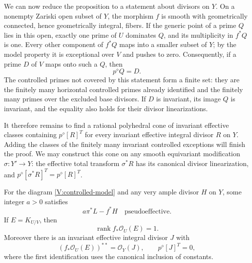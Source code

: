 We can now reduce the proposition to a statement about divisors on
$Y$.  On a nonempty Zariski open subset of $Y$, the morphism $f$ is
smooth with geometrically connected, hence geometrically integral,
fibers.  If the generic point of a prime $Q$ lies in this open, exactly
one prime of $U$ dominates $Q$, and its multiplicity in $f^*Q$ is one.
Every other component of $f^*Q$ maps into a smaller subset of $Y$;
by the model property it is exceptional over $V$ and pushes to zero.
Consequently, if a prime $D$ of $V$ maps onto such a $Q$, then
\[
 p^\diamond Q=D.
\]
The controlled primes not covered by this statement form a finite
set: they are the finitely many horizontal controlled primes already
identified and the finitely many primes over the excluded base divisors.
If $D$ is invariant, its image $Q$ is invariant, and the equality also
holds for their divisor linearizations.

It therefore remains to find a rational polyhedral cone of invariant
effective classes containing $p^\diamond[R]^T$ for every invariant
effective integral divisor $R$ on $Y$.  Adding the classes of the
finitely many invariant controlled exceptions will finish the proof.
We may construct this cone on any smooth equivariant modification
$\sigma:Y'\to Y$: the effective total transform $\sigma^*R$ has its
canonical divisor linearization, and
$p^\diamond[\sigma^*R]^T=p^\diamond[R]^T$.

\begin{lemma}\label{V:controlled-rank-metric-data}
For the diagram \eqref{V:controlled-model} and any very ample divisor
$H$ on $Y$, some integer $a>0$ satisfies
\begin{equation}\label{V:controlled-domination}
 a\pi^*L-f^*H\quad\text{pseudoeffective}.
\end{equation}
If $E=K_{U/V}$, then
\begin{equation}\label{V:controlled-rank}
 \operatorname{rank}f_*\mathcal O_U(E)=1.
\end{equation}
Moreover there is an invariant effective integral divisor $J$ with
\begin{equation}\label{V:controlled-J}
 (f_*\mathcal O_U(E))^{**}=\mathcal O_Y(J),
 \qquad p^\diamond[J]^T=0,
\end{equation}
where the first identification uses the canonical inclusion of constants.
\end{lemma}

